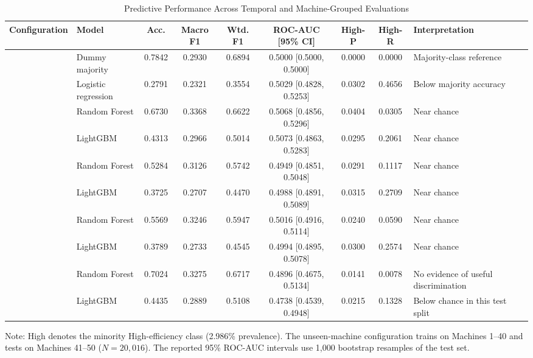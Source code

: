 \documentclass[conference]{IEEEtran}
\begin{document}
\begin{table}[t]
\caption{Predictive Performance Across Temporal and Machine-Grouped Evaluations}
\label{tab:model_ladder}
\centering
\footnotesize
\setlength{\tabcolsep}{3pt}
\begin{tabularx}{\textwidth}{@{}l l c c c c c c X@{}}
\toprule
\textbf{Configuration} & \textbf{Model} & \textbf{Acc.} & \textbf{Macro F1} & \textbf{Wtd. F1} & \textbf{ROC-AUC [95\% CI]} & \textbf{High-P} & \textbf{High-R} & \textbf{Interpretation} \\
\midrule
{} 
 & Dummy majority & 0.7842 & 0.2930 & 0.6894 & 0.5000 [0.5000, 0.5000] & 0.0000 & 0.0000 & Majority-class reference \\
 & Logistic regression & 0.2791 & 0.2321 & 0.3554 & 0.5029 [0.4828, 0.5253] & 0.0302 & 0.4656 & Below majority accuracy \\
 & Random Forest & 0.6730 & 0.3368 & 0.6622 & 0.5068 [0.4856, 0.5296] & 0.0404 & 0.0305 & Near chance \\
 & LightGBM & 0.4313 & 0.2966 & 0.5014 & 0.5073 [0.4863, 0.5283] & 0.0295 & 0.2061 & Near chance \\
\midrule
{} 
 & Random Forest & 0.5284 & 0.3126 & 0.5742 & 0.4949 [0.4851, 0.5048] & 0.0291 & 0.1117 & Near chance \\
 & LightGBM & 0.3725 & 0.2707 & 0.4470 & 0.4988 [0.4891, 0.5089] & 0.0315 & 0.2709 & Near chance \\
\midrule
{} 
 & Random Forest & 0.5569 & 0.3246 & 0.5947 & 0.5016 [0.4916, 0.5114] & 0.0240 & 0.0590 & Near chance \\
 & LightGBM & 0.3789 & 0.2733 & 0.4545 & 0.4994 [0.4895, 0.5078] & 0.0300 & 0.2574 & Near chance \\
\midrule
{} 
 & Random Forest & 0.7024 & 0.3275 & 0.6717 & 0.4896 [0.4675, 0.5134] & 0.0141 & 0.0078 & No evidence of useful discrimination \\
 & LightGBM & 0.4435 & 0.2889 & 0.5108 & 0.4738 [0.4539, 0.4948] & 0.0215 & 0.1328 & Below chance in this test split \\
\bottomrule
\end{tabularx}
\vspace{0.5ex}
{\raggedright \scriptsize Note: High denotes the minority High-efficiency class (2.986\% prevalence). The unseen-machine configuration trains on Machines 1--40 and tests on Machines 41--50 ($N = 20,016$). The reported 95\% ROC-AUC intervals use 1,000 bootstrap resamples of the test set.\par}
\end{table}
\end{document}
